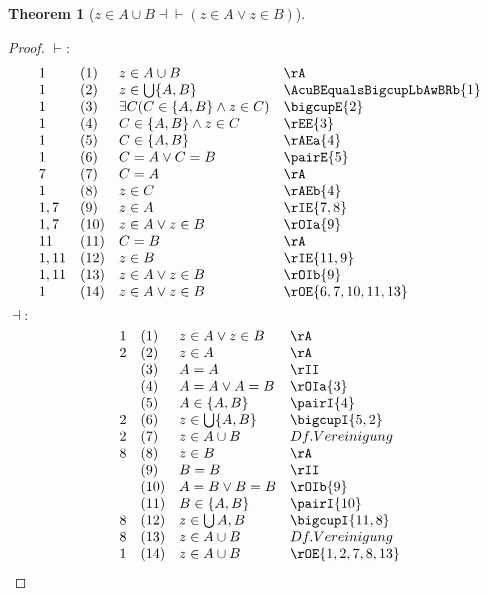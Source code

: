 \documentclass{book}
\theoremstyle{plain}
\newtheorem{theorem}{Theorem}
\theoremstyle{remark}
\theoremstyle{definition}
\begin{document}
\label{zInAcuBEqvLpzInAOrzInBRp}
\begin{theorem}[\(z \in A \cup B \dashv\vdash (z \in A \lor z \in B)\)]
\end{theorem}	
\begin{proof}
	\(\vdash:\)
	\[
	\begin{array}{llll}
		1 & (1) & z\in A \cup B & \rA \\
		1 & (2) & z\in \bigcup\{A,B\} & \AcuBEqualsBigcupLbAwBRb{1} \\
		1 & (3) & \exists C (C\in \{A,B\}\wedge z\in C) & \bigcupE{2} \\
		1 & (4) & C\in \{A,B\}\wedge z\in C & \rEE{3} \\
		1 & (5) & C\in \{A,B\} & \rAEa{4} \\
		1 & (6) & C=A\lor C=B & \pairE{5} \\
		7 & (7) & C=A & \rA \\
		1 & (8) & z\in C & \rAEb{4} \\
		1,7 & (9) & z\in A & \rIE{7,8} \\			
		1,7 & (10) & z\in A\lor z\in B & \rOIa{9} \\
		11 & (11) & C=B & \rA \\
		1,11 & (12) & z\in B & \rIE{11,9} \\			
		1,11 & (13) & z\in A\lor z\in B & \rOIb{9} \\
		1 & (14) & z\in A\lor z\in B & \rOE{6,7,10,11,13}				
	\end{array}
	\]
	\(\dashv:\)
	\[
	\begin{array}{llll}
		1 & (1) & z\in A\lor z\in B & \rA\\			
		2 & (2) & z\in A & \rA\\
		& (3) & A = A & \rII\\
		& (4) & A = A\lor A = B & \rOIa{3}\\
		& (5) & A\in\{A,B\} & \pairI{4}\\
		2 & (6) & z\in\bigcup \{A,B\} & \bigcupI{5,2}\\
		2 & (7) & z\in A\cup B & Df. Vereinigung\\
		8 & (8) & z\in B & \rA\\
		& (9) & B = B & \rII\\
		& (10) & A = B\lor B = B & \rOIb{9}\\
		& (11) & B\in\{A,B\} & \pairI{10}\\
		8 & (12) & z\in \bigcup{A,B} & \bigcupI{11,8}\\
		8 & (13) & z\in A\cup B & Df. Vereinigung\\
		1 & (14) & z\in A\cup B & \rOE{1,2,7,8,13}\\
	\end{array}
	\]
\end{proof}
\end{document}
